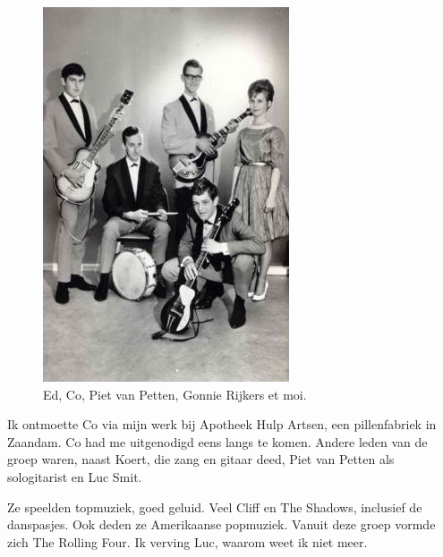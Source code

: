 \documentclass[12pt,twoside, openright]{memoir}
\begin{document}
\begin{figure}
\centering
\includegraphics[width=\textwidth]{img/142-RF}
\caption*{\footnotesize Ed, Co, Piet van Petten, Gonnie Rijkers et moi.}
\end{figure}

Ik ontmoette Co via mijn werk bij Apotheek Hulp Artsen, een pillenfabriek in Zaandam. Co had me uitgenodigd eens langs te komen. Andere leden van de groep waren, naast Koert, die zang en gitaar deed, Piet van Petten als sologitarist en Luc Smit.  

Ze speelden topmuziek, goed geluid. Veel Cliff en The Shadows, inclusief de danspasjes. Ook deden ze Amerikaanse popmuziek. Vanuit deze groep vormde zich The Rolling Four. Ik verving Luc, waarom weet ik niet meer.
\end{document}
